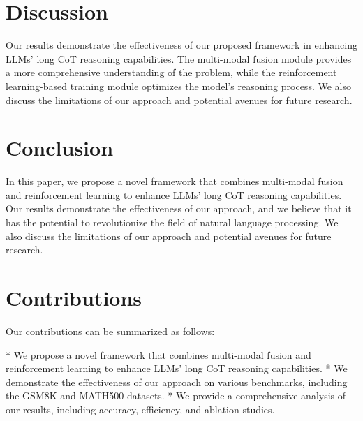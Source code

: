 \documentclass{article}
\begin{document}
\section{Discussion}

Our results demonstrate the effectiveness of our proposed framework in enhancing LLMs' long CoT reasoning capabilities. The multi-modal fusion module provides a more comprehensive understanding of the problem, while the reinforcement learning-based training module optimizes the model's reasoning process. We also discuss the limitations of our approach and potential avenues for future research.

\section{Conclusion}

In this paper, we propose a novel framework that combines multi-modal fusion and reinforcement learning to enhance LLMs' long CoT reasoning capabilities. Our results demonstrate the effectiveness of our approach, and we believe that it has the potential to revolutionize the field of natural language processing. We also discuss the limitations of our approach and potential avenues for future research.

\section{Contributions}

Our contributions can be summarized as follows:

* We propose a novel framework that combines multi-modal fusion and reinforcement learning to enhance LLMs' long CoT reasoning capabilities.
* We demonstrate the effectiveness of our approach on various benchmarks, including the GSM8K and MATH500 datasets.
* We provide a comprehensive analysis of our results, including accuracy, efficiency, and ablation studies.
\end{document}
